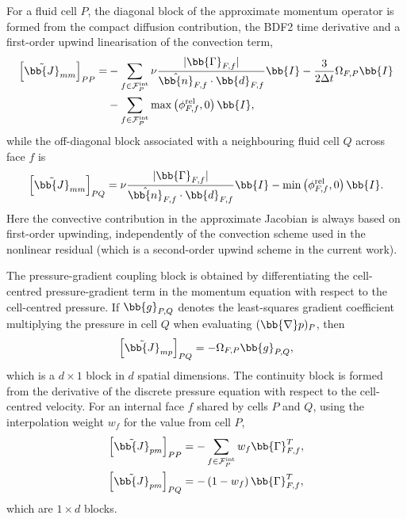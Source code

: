 For a fluid cell $P$, the diagonal block of the approximate momentum operator
is formed from the compact diffusion contribution, the BDF2 time derivative and
a first-order upwind linearisation of the convection term,
\begin{align}
    \left[\tilde{\bb{J}}_{mm}\right]_{PP}
    =
    &-
    \sum_{f \in \mathcal{F}^{\mathrm{int}}_P}
    \nu
    \frac{|\bb{\Gamma}_{F,f}|}
         {\hat{\bb{n}}_{F,f} \cdot \bb{d}_{F,f}}
    \bb{I}
    -
    \frac{3}{2\Delta t}
    \Omega_{F,P}
    \bb{I}
    \notag \\
    &-
    \sum_{f \in \mathcal{F}^{\mathrm{int}}_P}
    \max\left(\phi^{\mathrm{rel}}_{F,f},0\right)\bb{I},
    \label{qm:eqn:Jmm_diag}
\end{align}
while the off-diagonal block associated with a neighbouring fluid cell $Q$
across face $f$ is
\begin{equation}
    \left[\tilde{\bb{J}}_{mm}\right]_{PQ}
    =
    \nu
    \frac{|\bb{\Gamma}_{F,f}|}
         {\hat{\bb{n}}_{F,f} \cdot \bb{d}_{F,f}}
    \bb{I}
    -
    \min\left(\phi^{\mathrm{rel}}_{F,f},0\right)\bb{I}.
    \label{qm:eqn:Jmm_offdiag}
\end{equation}
Here the convective contribution in the approximate Jacobian is always based on first-order upwinding, independently of the convection scheme used in the nonlinear residual (which is a second-order upwind scheme in the current work).

The pressure-gradient coupling block is obtained by differentiating the cell-centred pressure-gradient term in the momentum equation with respect to the cell-centred pressure.
If $\bb{g}_{P,Q}$ denotes the least-squares gradient coefficient multiplying the pressure in cell $Q$ when evaluating $(\bb{\nabla}p)_P$, then
\begin{equation}
    \left[\tilde{\bb{J}}_{mp}\right]_{P Q}
    =
    -
    \Omega_{F,P}
    \bb{g}_{P,Q},
    \label{qm:eqn:Jmp}
\end{equation}
which is a $d\times 1$ block in $d$ spatial dimensions.
The continuity block is formed from the derivative of the discrete pressure
equation with respect to the cell-centred velocity. For an internal face $f$
shared by cells $P$ and $Q$, using the interpolation weight $w_f$ for the value
from cell $P$,
\begin{align}
    \left[\tilde{\bb{J}}_{pm}\right]_{PP}
    &=
    -
    \sum_{f \in \mathcal{F}^{\mathrm{int}}_P}
    w_f \bb{\Gamma}_{F,f}^{T},
    \label{qm:eqn:Jpm_diag}
    \\
    \left[\tilde{\bb{J}}_{pm}\right]_{PQ}
    &=
    -
    \left(1-w_f\right)\bb{\Gamma}_{F,f}^{T},
    \label{qm:eqn:Jpm_offdiag}
\end{align}
which are $1\times d$ blocks.

